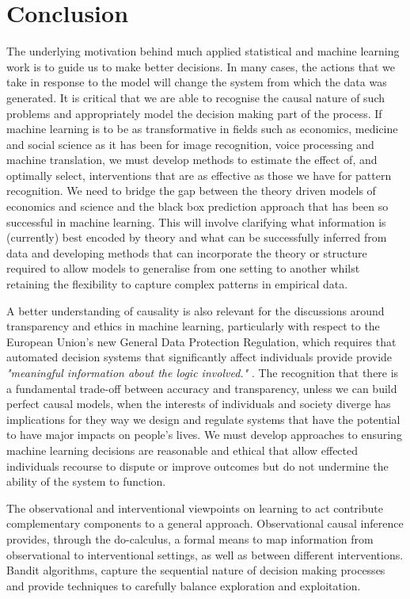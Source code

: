 \documentclass[11pt,a4paper,twoside]{report}
\theoremstyle{plain}
\theoremstyle{definition}
\begin{document}
\chapter{Conclusion}

The underlying motivation behind much applied statistical and machine learning work is to guide us to make better decisions. In many cases, the actions that we take in response to the model will change the system from which the data was generated. It is critical that we are able to recognise the causal nature of such problems and appropriately model the decision making part of the process. If machine learning is to be as transformative in fields such as economics, medicine and social science as it has been for image recognition, voice processing and machine translation, we must develop methods to estimate the effect of, and optimally select, interventions that are as effective as those we have for pattern recognition. We need to bridge the gap between the theory driven models of economics and science and the black box prediction approach that has been so successful in machine learning. This will involve clarifying what information is (currently) best encoded by theory and what can be successfully inferred from data and developing methods that can incorporate the theory or structure required to allow models to generalise from one setting to another whilst retaining the flexibility to capture complex patterns in empirical data. 

A better understanding of causality is also relevant for the discussions around transparency and ethics in machine learning, particularly with respect to the European Union's new General Data Protection Regulation, which requires that automated decision systems that significantly affect individuals provide provide \textit{"meaningful information about the logic involved."} \cite{Goodman2016}. The recognition that there is a fundamental trade-off between accuracy and transparency, unless we can build perfect causal models, when the interests of individuals and society diverge has implications for they way we design and regulate systems that have the potential to have major impacts on people's lives. We must develop approaches to ensuring machine learning decisions are reasonable and ethical that allow effected individuals recourse to dispute or improve outcomes but do not undermine the ability of the system to function. 

The observational and interventional viewpoints on learning to act contribute complementary components to a general approach. Observational causal inference provides, through the do-calculus, a formal means to map information from observational to interventional settings, as well as between different interventions. Bandit algorithms, capture the sequential nature of decision making processes and provide techniques to carefully balance exploration and exploitation. 
\end{document}
